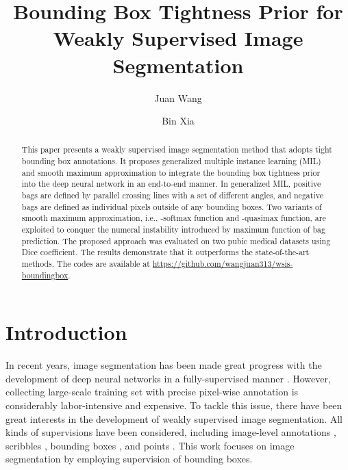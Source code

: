 \documentclass[runningheads]{llncs}
\begin{document}
\title{Bounding Box Tightness Prior for Weakly Supervised Image Segmentation}
\author{Juan Wang \and
Bin Xia}
\maketitle              \begin{abstract}
This paper presents a weakly supervised image segmentation method that adopts tight bounding box annotations. It proposes generalized multiple instance learning (MIL) and smooth maximum approximation to integrate the bounding box tightness prior into the deep neural network in an end-to-end manner. In generalized MIL, positive bags are defined by parallel crossing lines with a set of different angles, and negative bags are defined as individual pixels outside of any bounding boxes. Two variants of smooth maximum approximation, i.e., -softmax function and -quasimax function, are exploited to conquer the numeral instability introduced by maximum function of bag prediction. The proposed approach was evaluated on two pubic medical datasets using Dice coefficient. The results demonstrate that it outperforms the state-of-the-art methods. The codes are available at \url{https://github.com/wangjuan313/wsis-boundingbox}.

\end{abstract}


\section{Introduction}

In recent years, image segmentation has been made great progress with the development of deep neural networks in a fully-supervised manner \cite{ronneberger2015u,long2015fully,chen2018encoder}. However, collecting large-scale training set with precise pixel-wise annotation is considerably labor-intensive and expensive. To tackle this issue, there have been great interests in the development of weakly supervised image segmentation. All kinds of supervisions have been considered, including image-level annotations \cite{ahn2019weakly,wang2020self}, scribbles \cite{lin2016scribblesup}, bounding boxes \cite{rajchl2016deepcut,kervadec2020bounding}, and points \cite{bearman2016s}. This work focuses on image segmentation by employing supervision of bounding boxes. 
\end{document}
